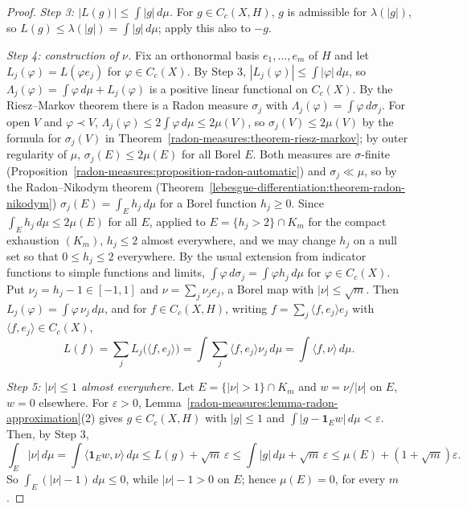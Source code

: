 \begin{proof}
\emph{Step 3: $|L(g)| \leq \int|g|\,d\mu$.} For $g \in C_c(X, H)$, $g$ is admissible for $\lambda(|g|)$, so $L(g) \leq \lambda(|g|) = \int|g|\,d\mu$; apply this also to $-g$.

\emph{Step 4: construction of $\nu$.} Fix an orthonormal basis $e_1, \ldots, e_m$ of $H$ and let $L_j(\varphi) = L(\varphi e_j)$ for $\varphi \in C_c(X)$. By Step 3, $|L_j(\varphi)| \leq \int|\varphi|\,d\mu$,
so $\Lambda_j(\varphi) = \int\varphi\,d\mu + L_j(\varphi)$ is a positive linear functional on $C_c(X)$. By the Riesz--Markov theorem there is a Radon measure $\sigma_j$ with $\Lambda_j(\varphi) = \int\varphi\,d\sigma_j$.
For open $V$ and $\varphi \prec V$, $\Lambda_j(\varphi) \leq 2\int\varphi\,d\mu \leq 2\mu(V)$, so $\sigma_j(V) \leq 2\mu(V)$ by the formula for $\sigma_j(V)$ in Theorem~\ref{radon-measures:theorem-riesz-markov}; by
outer regularity of $\mu$, $\sigma_j(E) \leq 2\mu(E)$ for all Borel $E$. Both measures are $\sigma$-finite (Proposition~\ref{radon-measures:proposition-radon-automatic}) and $\sigma_j \ll \mu$, so by the
Radon--Nikodym theorem (Theorem~\ref{lebesgue-differentiation:theorem-radon-nikodym}) $\sigma_j(E) = \int_Eh_j\,d\mu$ for a Borel function $h_j \geq 0$. Since $\int_Eh_j\,d\mu \leq 2\mu(E)$ for all $E$, applied to
$E = \{h_j > 2\} \cap K_m$ for the compact exhaustion $(K_m)$, $h_j \leq 2$ almost everywhere, and we may change $h_j$ on a null set so that $0 \leq h_j \leq 2$ everywhere. By the usual extension from
indicator functions to simple functions and limits, $\int\varphi\,d\sigma_j = \int\varphi h_j\,d\mu$ for $\varphi \in C_c(X)$. Put $\nu_j = h_j - 1 \in [-1, 1]$ and $\nu = \sum_j\nu_je_j$, a Borel map with
$|\nu| \leq \sqrt m$. Then $L_j(\varphi) = \int\varphi\,\nu_j\,d\mu$, and for $f \in C_c(X, H)$, writing $f = \sum_j\langle f, e_j\rangle e_j$ with $\langle f, e_j\rangle \in C_c(X)$,
\[
L(f) = \sum_jL_j\bigl(\langle f, e_j\rangle\bigr) = \int\sum_j\langle f, e_j\rangle\nu_j\,d\mu = \int\langle f, \nu\rangle\,d\mu .
\]

\emph{Step 5: $|\nu| \leq 1$ almost everywhere.} Let $E = \{|\nu| > 1\} \cap K_m$ and $w = \nu/|\nu|$ on $E$, $w = 0$ elsewhere. For $\varepsilon > 0$, Lemma~\ref{radon-measures:lemma-radon-approximation}(2) gives
$g \in C_c(X, H)$ with $|g| \leq 1$ and $\int|g - \mathbf{1}_Ew|\,d\mu < \varepsilon$. Then, by Step 3,
\[
\int_E|\nu|\,d\mu = \int\langle\mathbf{1}_Ew, \nu\rangle\,d\mu \leq L(g) + \sqrt m\,\varepsilon \leq \int|g|\,d\mu + \sqrt m\,\varepsilon \leq \mu(E) + (1 + \sqrt m)\varepsilon .
\]
So $\int_E(|\nu| - 1)\,d\mu \leq 0$, while $|\nu| - 1 > 0$ on $E$; hence $\mu(E) = 0$, for every $m$.


\end{proof}
